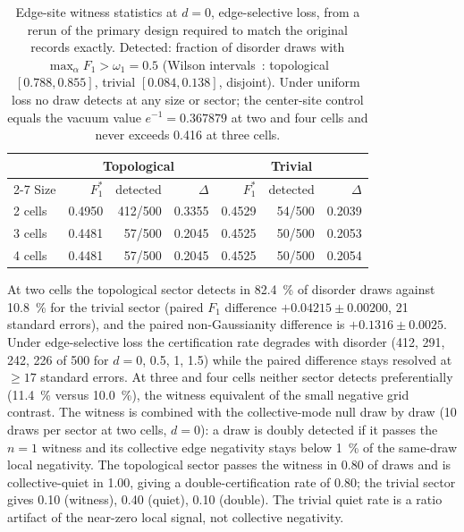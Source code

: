 \documentclass[aps,pra,preprint,superscriptaddress,amsmath,amssymb]{revtex4-2}
\begin{document}
\begin{table}[h]
\caption{Edge-site witness statistics at $d=\num{0}$, edge-selective loss, from a rerun of the primary design required to match the original records exactly. Detected: fraction of disorder draws with $\max_\alpha F_1>\omega_1=\num{0.5}$ (Wilson intervals~\cite{Wilson1927}: topological $[\num{0.788},\num{0.855}]$, trivial $[\num{0.084},\num{0.138}]$, disjoint). Under uniform loss no draw detects at any size or sector; the center-site control equals the vacuum value $e^{-1}=\num{0.367879}$ at two and four cells and never exceeds \num{0.416} at three cells.}
\label{tab:witness}
\begin{ruledtabular}
\begin{tabular}{lrrrrrr}
& \multicolumn{3}{c}{Topological} & \multicolumn{3}{c}{Trivial} \\
\cline{2-7}
Size & $F_1^*$ & detected & $\Delta$ & $F_1^*$ & detected & $\Delta$ \\
\hline
\num{2} cells & \num{0.4950} & \num{412}/\num{500} & \num{0.3355} & \num{0.4529} & \num{54}/\num{500} & \num{0.2039} \\
\num{3} cells & \num{0.4481} & \num{57}/\num{500} & \num{0.2045} & \num{0.4525} & \num{50}/\num{500} & \num{0.2053} \\
\num{4} cells & \num{0.4481} & \num{57}/\num{500} & \num{0.2045} & \num{0.4525} & \num{50}/\num{500} & \num{0.2054} \\
\end{tabular}
\end{ruledtabular}
\end{table}

At two cells the topological sector detects in \qty{82.4}{\percent} of disorder draws against \qty{10.8}{\percent} for the trivial sector (paired $F_1$ difference $+\num{0.04215}\pm\num{0.00200}$, \num{21} standard errors), and the paired non-Gaussianity difference is $+\num{0.1316}\pm\num{0.0025}$. Under edge-selective loss the certification rate degrades with disorder (\num{412}, \num{291}, \num{242}, \num{226} of \num{500} for $d=\num{0}$, \num{0.5}, \num{1}, \num{1.5}) while the paired difference stays resolved at $\ge\num{17}$ standard errors. At three and four cells neither sector detects preferentially (\qty{11.4}{\percent} versus \qty{10.0}{\percent}), the witness equivalent of the small negative grid contrast. The witness is combined with the collective-mode null draw by draw (\num{10} draws per sector at two cells, $d=\num{0}$): a draw is doubly detected if it passes the $n=\num{1}$ witness and its collective edge negativity stays below \qty{1}{\percent} of the same-draw local negativity. The topological sector passes the witness in \num{0.80} of draws and is collective-quiet in \num{1.00}, giving a double-certification rate of \num{0.80}; the trivial sector gives \num{0.10} (witness), \num{0.40} (quiet), \num{0.10} (double). The trivial quiet rate is a ratio artifact of the near-zero local signal, not collective negativity.
\end{document}
